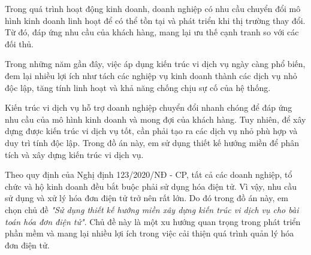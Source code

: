 Trong quá trình hoạt động kinh doanh, doanh nghiệp có nhu cầu chuyển đổi mô hình kinh doanh linh hoạt để có thể tồn tại và phát triển khi thị trường thay đổi. Từ đó, đáp ứng nhu cầu của khách hàng, mang lại ưu thế cạnh tranh so với các đối thủ.

Trong những năm gần đây, việc áp dụng kiến trúc vi dịch vụ ngày càng phổ biến, đem lại nhiều lợi ích như tách các nghiệp vụ kinh doanh thành các dịch vụ nhỏ độc lập, tăng tính linh hoạt và khả năng chống chịu sự cố của hệ thống.

Kiến trúc vi dịch vụ hỗ trợ doanh nghiệp chuyển đổi nhanh chóng để đáp ứng nhu cầu của mô hình kinh doanh và mong đợi của khách hàng. Tuy nhiên, để xây dựng được kiến trúc vi dịch vụ tốt, cần phải tạo ra các dịch vụ nhỏ phù hợp và duy trì tính độc lập. Trong đồ án này, em sử dụng thiết kế hướng miền để phân tích và xây dựng kiến trúc vi dịch vụ.

Theo quy định của Nghị định 123/2020/NĐ - CP, tất cả các doanh nghiệp, tổ chức và hộ kinh doanh đều bắt buộc phải sử dụng hóa điện tử. Vì vậy, nhu cầu sử dụng và xử lý hóa đơn điện tử trở nên rất lớn. Do đó trong đồ án này, em chọn chủ đề \emph{"Sử dụng thiết kế hướng miền xây dựng kiến trúc vi dịch vụ cho bài toán hóa đơn điện tử"}. Chủ đề này là một xu hướng quan trọng trong phát triển phần mềm và mang lại nhiều lợi ích trong việc cải thiện quá trình quản lý hóa đơn điện tử.